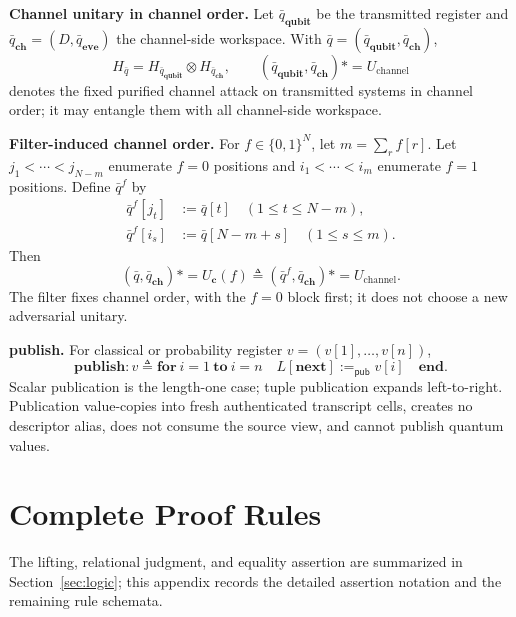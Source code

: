 \documentclass[conference,compsoc]{IEEEtran}
\newcommand{\asteq}{\mathrel{*\!=}}
\begin{document}
\smallskip
\noindent\textbf{Channel unitary in channel order.}
Let \(\bar q_{\mathbf{qubit}}\) be the transmitted register and
\(\bar q_{\mathbf{ch}}=(D,\bar q_{\mathbf{eve}})\) the channel-side workspace.
With \(\bar q=(\bar q_{\mathbf{qubit}},\bar q_{\mathbf{ch}})\),
\[
H_{\bar q}=H_{\bar q_{\mathbf{qubit}}}\otimes H_{\bar q_{\mathbf{ch}}},
\qquad
(\bar q_{\mathbf{qubit}},\bar q_{\mathbf{ch}})\asteq U_{\mathrm{channel}}
\]
denotes the fixed purified channel attack on transmitted systems in channel
order; it may entangle them with all channel-side workspace.

\smallskip
\noindent\textbf{Filter-induced channel order.}
For \(f\in\{0,1\}^{N}\), let \(m=\sum_r f[r]\). Let
\(j_1<\cdots<j_{N-m}\) enumerate \(f=0\) positions and
\(i_1<\cdots<i_m\) enumerate \(f=1\) positions. Define \(\bar q^f\) by
\[
\begin{aligned}
\bar q^f[j_t]&:=\bar q[t]
\quad(1\le t\le N-m),\\
\bar q^f[i_s]&:=\bar q[N-m+s]
\quad(1\le s\le m).
\end{aligned}
\]
Then
\[
(\bar q,\bar q_{\mathbf{ch}})\asteq U_{\mathbf c}(f)
\triangleq
(\bar q^f,\bar q_{\mathbf{ch}})\asteq U_{\mathrm{channel}}.
\]
The filter fixes channel order, with the \(f=0\) block first; it does not choose
a new adversarial unitary.

\smallskip
\noindent\textbf{publish.}
For classical or probability register \(v=(v[1],\ldots,v[n])\),
\[
\mathbf{publish: }v
\triangleq
\mathbf{for}\ i=1\ \mathbf{to}\ i=n\quad
L[\mathbf{next}]:=_{\mathsf{pub}}v[i]\quad\mathbf{end}.
\]
Scalar publication is the length-one case; tuple publication expands
left-to-right. Publication value-copies into fresh authenticated transcript
cells, creates no descriptor alias, does not consume the source view, and cannot
publish quantum values.
\endgroup

\section{Complete Proof Rules}
\label{app:judgment-rules}
\begingroup
\setlength{\abovedisplayskip}{2pt}
\setlength{\belowdisplayskip}{2pt}
\setlength{\abovedisplayshortskip}{1pt}
\setlength{\belowdisplayshortskip}{1pt}
\setlength{\jot}{1pt}
\setlength{\arraycolsep}{2pt}
\allowdisplaybreaks

The lifting, relational judgment, and equality assertion are summarized in
Section~\ref{sec:logic}; this appendix records the detailed assertion notation
and the remaining rule schemata.
\end{document}
